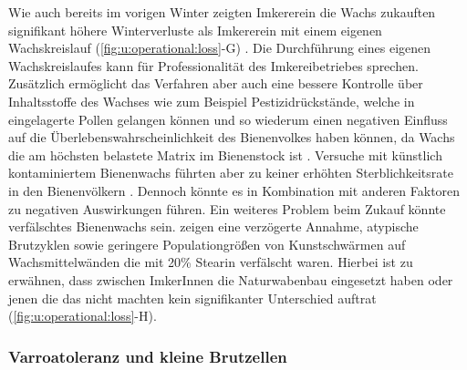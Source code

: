 Wie auch bereits im vorigen Winter zeigten Imkererein die Wachs zukauften signifikant höhere Winterverluste als Imkererein mit einem eigenen Wachskreislauf (\cref{fig:u:operational:loss}-G) \citep{oberreiter2020}. Die Durchführung eines eigenen Wachskreislaufes kann für Professionalität des Imkereibetriebes sprechen. Zusätzlich ermöglicht das Verfahren aber auch eine bessere Kontrolle über Inhaltsstoffe des Wachses wie zum Beispiel Pestizidrückstände, welche in eingelagerte Pollen gelangen können und so wiederum einen negativen Einfluss auf die Überlebenswahrscheinlichkeit des Bienenvolkes haben können, da Wachs die am höchsten belastete Matrix im Bienenstock ist \citep{calatayud-vernich2018, harriet2017, elagrebi2020}. Versuche mit künstlich kontaminiertem Bienenwachs führten aber zu keiner erhöhten Sterblichkeitsrate in den Bienenvölkern \citep{payne2019}. Dennoch könnte es in Kombination mit anderen Faktoren zu negativen Auswirkungen führen. Ein weiteres Problem beim Zukauf könnte verfälschtes Bienenwachs sein. \cite{alkassab2020} zeigen eine verzögerte Annahme, atypische Brutzyklen sowie geringere Populationgrößen von Kunstschwärmen auf Wachsmittelwänden die mit 20\% Stearin verfälscht waren.    
\newline
Hierbei ist zu erwähnen, dass zwischen ImkerInnen die Naturwabenbau eingesetzt haben oder jenen die das nicht machten kein signifikanter Unterschied auftrat (\cref{fig:u:operational:loss}-H). 

\subsubsection{Varroatoleranz und kleine Brutzellen}

